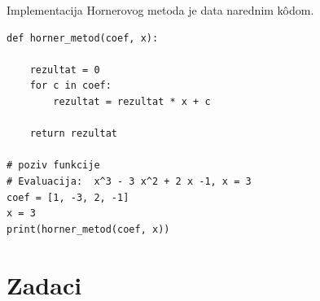  Implementacija Hornerovog metoda je data narednim k\^odom. 
	 
	 \begin{verbatim}
def horner_metod(coef, x):

    rezultat = 0
    for c in coef:
        rezultat = rezultat * x + c

    return rezultat

# poziv funkcije
# Evaluacija:  x^3 - 3 x^2 + 2 x -1, x = 3
coef = [1, -3, 2, -1]
x = 3
print(horner_metod(coef, x))
\end{verbatim}


 
 
 \section*{Zadaci}
 
